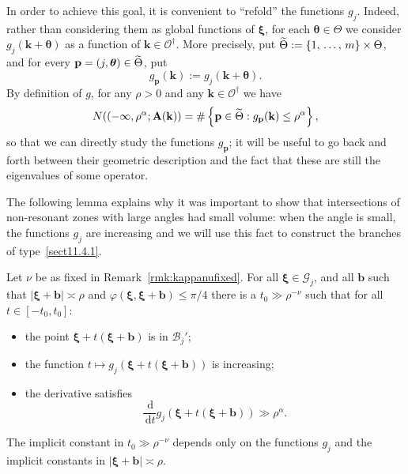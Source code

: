 \documentclass[AHL,Unicode,longabstracts,published]{cedram}
\newcommand{\de}{\, \mathrm{d}}
\newcommand{\CB}{\mathcal{B}}
\newcommand{\CG}{\mathcal{G}}
\newcommand{\CO}{\mathcal{O}}
\newcommand{\btheta}{\boldsymbol \theta}
\newcommand{\bxi}{\boldsymbol \xi}
\newcommand{\BA}{\mathbf A}
\newcommand{\bbb}{\mathbf b}
\newcommand{\bk}{\mathbf k}
\newcommand{\bp}{\mathbf p}
\renewcommand{\phi}{\varphi}
\newcommand{\abs}[1]{\left\lvert #1 \right\rvert}
\newcommand{\set}[1]{\left\{ #1 \right\}}
\let\oldtilde\tilde
\renewcommand*{\tilde}[1]{\mathchoice{\widetilde{#1}}{\widetilde{#1}}{\oldtilde{#1}}{\oldtilde{#1}}}
\begin{document}
In order to achieve this goal, it is convenient to ``refold'' the functions $g_j$. Indeed, rather than considering them as global functions of $\bxi$, for each $\btheta \in \Theta$ we consider $g_j(\bk+\btheta)$ as a function of $\bk
\in \CO^\dagger$. More precisely, put $\tilde \Theta := \set{1,\,\dotsc,\,m}
\times \Theta$, and for every $\bp = (j,\btheta) \in \tilde \Theta$, put
\begin{equation}
g_\bp(\bk) := g_j(\bk + \btheta).
\end{equation}
By definition of $g$, for any $\rho > 0$ and any $\bk \in \CO^\dagger$ we have
\begin{equation}
N((-\infty, \rho^\alpha;\BA(\bk)) = \#\set{\bp \in \tilde \Theta : g_\bp(\bk) \le \rho^\alpha},
\end{equation}
so that we can directly study the functions $g_\bp$; it will be useful to go back and forth between their geometric description and the fact that these are still the eigenvalues of some operator.

The following lemma explains why it was important to show that intersections of non-resonant zones with large angles had small volume: when the angle is small, the functions $g_j$ are increasing and we will use this fact to construct the branches of type~\eqref{sect11.4.1}.
\begin{lemm} \label{lem:increasing}
Let $\nu$ be as fixed in Remark~\ref{rmk:kappanufixed}. For all $\bxi \in
\CG_j$, and all $\bbb$ such that $\abs{\bxi + \bbb} \asymp \rho$ and $\phi(\bxi,\bxi+\bbb) \le \pi/4$ there is a $t_0 \gg \rho^{-\nu}$ such that for all $t \in [-t_0,t_0]$:
\begin{itemize}
\item the point $\bxi + t(\bxi + \bbb)$ is in $\CB_j'$;
\item the function $t \mapsto g_j(\bxi + t(\bxi + \bbb))$ is increasing;
\item the derivative satisfies
\begin{equation}
\frac{\de}{\de t}g_j(\bxi + t(\bxi + \bbb)) \gg \rho^\alpha.
\end{equation}
\end{itemize}
The implicit constant in $t_0 \gg \rho^{-\nu}$ depends only on the functions $g_j$ and the implicit constants in $\abs{\bxi + \bbb} \asymp
\rho$.
\end{lemm}
\end{document}
